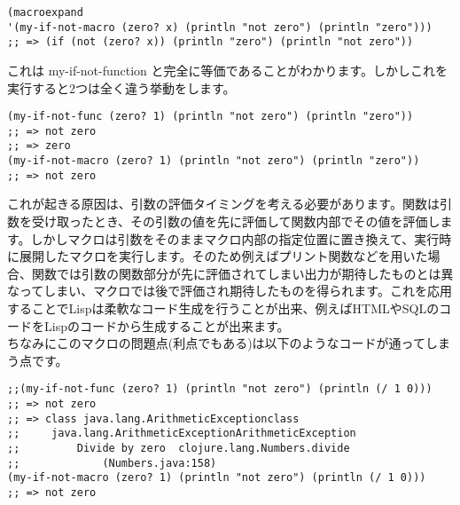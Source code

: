 \documentclass[a4paper, dvipdfmx, 12pt]{article}
\begin{document}
\begin{verbatim}
(macroexpand 
'(my-if-not-macro (zero? x) (println "not zero") (println "zero")))
;; => (if (not (zero? x)) (println "zero") (println "not zero"))
\end{verbatim}

これは my-if-not-function  と完全に等価であることがわかります。しかしこれを実行すると2つは全く違う挙動をします。\\

\begin{verbatim}
(my-if-not-func (zero? 1) (println "not zero") (println "zero"))
;; => not zero 
;; => zero
(my-if-not-macro (zero? 1) (println "not zero") (println "zero"))
;; => not zero
\end{verbatim}

これが起きる原因は、引数の評価タイミングを考える必要があります。関数は引数を受け取ったとき、その引数の値を先に評価して関数内部でその値を評価します。しかしマクロは引数をそのままマクロ内部の指定位置に置き換えて、実行時に展開したマクロを実行します。そのため例えばプリント関数などを用いた場合、関数では引数の関数部分が先に評価されてしまい出力が期待したものとは異なってしまい、マクロでは後で評価され期待したものを得られます。これを応用することでLispは柔軟なコード生成を行うことが出来、例えばHTMLやSQLのコードをLispのコードから生成することが出来ます。\\

ちなみにこのマクロの問題点(利点でもある)は以下のようなコードが通ってしまう点です。\\

\begin{verbatim}
;;(my-if-not-func (zero? 1) (println "not zero") (println (/ 1 0)))
;; => not zero
;; => class java.lang.ArithmeticExceptionclass 
;;     java.lang.ArithmeticExceptionArithmeticException
;;         Divide by zero  clojure.lang.Numbers.divide 
;;             (Numbers.java:158)
(my-if-not-macro (zero? 1) (println "not zero") (println (/ 1 0)))
;; => not zero
\end{verbatim}
\end{document}
